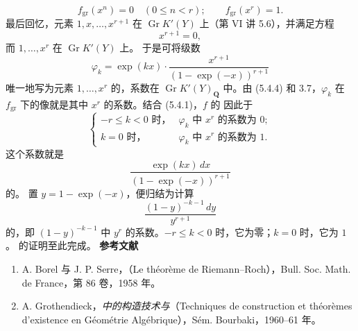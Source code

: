\[f_{\mathrm{gr}}(x^n)=0\quad(0\leq n<r);\qquad f_{\mathrm{gr}}(x^r)=1.\tag{5.4.4}\]
最后回忆，元素 $1,x,\ldots,x^{r+1}$ 在 $\operatorname{Gr}K'(Y)$ 上（第 VI 讲 5.6），并满足方程
\[x^{r+1}=0,\tag{5.4.5}\]
而 $1,\ldots,x^r$ 在 $\operatorname{Gr}K'(Y)$ 上。
于是可将级数
\[\varphi_k=\exp(kx)\cdot\frac{x^{r+1}}{(1-\exp(-x))^{r+1}}\]
唯一地写为元素 $1,\ldots,x^r$ 的，系数在 $\operatorname{Gr}K'(Y)_{\mathbf Q}$ 中。由 (5.4.4) 和 3.7，$\varphi_k$ 在 $f_{\mathrm{gr}}$ 下的像就是其中 $x^r$ 的系数。结合 (5.4.1)，$f$ 的 因此于
\[
\left\{\begin{array}{ll}
-r\leq k<0\text{ 时，}&\varphi_k\text{ 中 }x^r\text{ 的系数为 }0;\\
k=0\text{ 时，}&\varphi_k\text{ 中 }x^r\text{ 的系数为 }1.
\end{array}\right.\tag{RR}
\]
这个系数就是
\[\frac{\exp(kx)\,dx}{(1-\exp(-x))^{r+1}}\]
的。
置 $y=1-\exp(-x)$，便归结为计算
\[\frac{(1-y)^{-k-1}\,dy}{y^{r+1}}\]
的，即 $(1-y)^{-k-1}$ 中 $y^r$ 的系数。$-r\leq k<0$ 时，它为零；$k=0$ 时，它为 $1$。
的证明至此完成。
\bigskip
\textbf{参考文献}
\begin{enumerate}
\item[{[1]}] A. Borel 与 J. P. Serre，\emph{}（Le théorème de Riemann--Roch），Bull. Soc. Math. de France，第 86 卷，1958 年。
\item[{[2]}] A. Grothendieck，\emph{中的构造技术与}（Techniques de construction et théorèmes d'existence en Géométrie Algébrique），Sém. Bourbaki，1960--61 年。
\end{enumerate}
